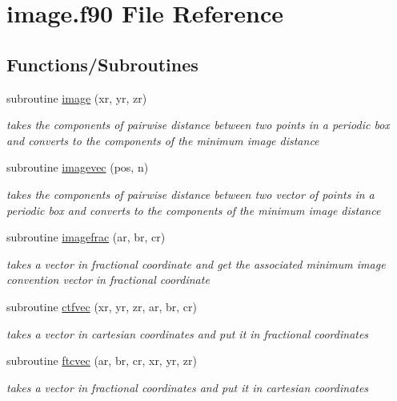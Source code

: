 \hypertarget{image_8f90}{\section{image.\-f90 File Reference}
\label{image_8f90}
}
\subsection*{Functions/\-Subroutines}
\begin{DoxyCompactItemize}
\item 
subroutine \hyperlink{image_8f90_afafb2542d1faa53dbba8933a21da60fa}{image} (xr, yr, zr)
\begin{DoxyCompactList}\small\item\em takes the components of pairwise distance between two points in a periodic box and converts to the components of the minimum image distance \end{DoxyCompactList}\item 
subroutine \hyperlink{image_8f90_aa8b5ff6b3c80a1787b7437cf847eb5a4}{imagevec} (pos, n)
\begin{DoxyCompactList}\small\item\em takes the components of pairwise distance between two vector of points in a periodic box and converts to the components of the minimum image distance \end{DoxyCompactList}\item 
subroutine \hyperlink{image_8f90_aa029860a01e2c9067a39c86cbdd5159e}{imagefrac} (ar, br, cr)
\begin{DoxyCompactList}\small\item\em takes a vector in fractional coordinate and get the associated minimum image convention vector in fractional coordinate \end{DoxyCompactList}\item 
subroutine \hyperlink{image_8f90_af7d96ecbc9bda09adc405dfaf51fbb1b}{ctfvec} (xr, yr, zr, ar, br, cr)
\begin{DoxyCompactList}\small\item\em takes a vector in cartesian coordinates and put it in fractional coordinates \end{DoxyCompactList}\item 
subroutine \hyperlink{image_8f90_a8a481b32f403e99e68cfebb1d9f1d98f}{ftcvec} (ar, br, cr, xr, yr, zr)
\begin{DoxyCompactList}\small\item\em takes a vector in fractional coordinates and put it in cartesian coordinates \end{DoxyCompactList}\end{DoxyCompactItemize}


